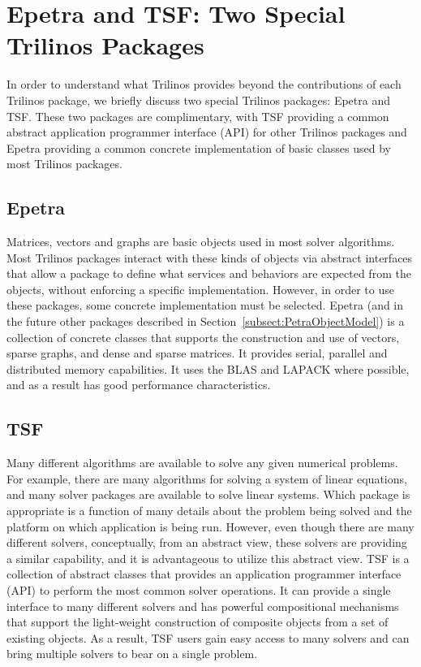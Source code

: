 \documentclass[12pt,relax]{SANDreport}
\begin{document}
\section{Epetra and TSF: Two Special Trilinos Packages}
\label{sect:EpetraAndTSF}
In order to understand what Trilinos provides beyond the
contributions of each Trilinos package, we briefly discuss two special
Trilinos packages: Epetra and TSF.  These two packages are complimentary,
with TSF providing a common abstract application
programmer interface (API) for other Trilinos packages and Epetra
providing a common concrete implementation of basic classes used by most
Trilinos packages.

\subsection{Epetra}
Matrices, vectors and graphs are basic objects used in most solver
algorithms. Most Trilinos
packages interact with these kinds of objects via abstract interfaces that
allow a package to define what services and behaviors are expected from the objects,
without enforcing a specific implementation.  However, in order to use
these packages, some concrete
implementation must be selected.  Epetra (and in the future other packages described
in Section~\ref{subsect:PetraObjectModel}) is a collection of concrete
classes that supports the construction and use of vectors, sparse
graphs, and dense and sparse matrices.  It provides serial, parallel and
 distributed memory
capabilities.  It uses the BLAS and LAPACK where possible, and as a
result has good performance characteristics.

\subsection{TSF}
\label{subsect:InteropTSF}
Many different algorithms are available to solve any given numerical
problems.  For example, there are many algorithms for solving a system
of linear equations, and many solver packages are available to solve
linear systems.  Which package is appropriate is a function of
many details about the problem being solved and the platform on which
application is being run. However, even though
there are many different solvers, conceptually, from an abstract view,
these solvers are providing a similar capability, and it is
advantageous to utilize this abstract view.
TSF is a collection of abstract classes that provides an application
programmer interface (API) to perform the most common solver
operations.  It can provide a single interface to many different
solvers and has powerful compositional mechanisms that support the
light-weight construction of composite objects from a set of
existing objects.  As a result, TSF users gain easy access to many
solvers and can bring multiple solvers to bear on a single problem.
\end{document}
